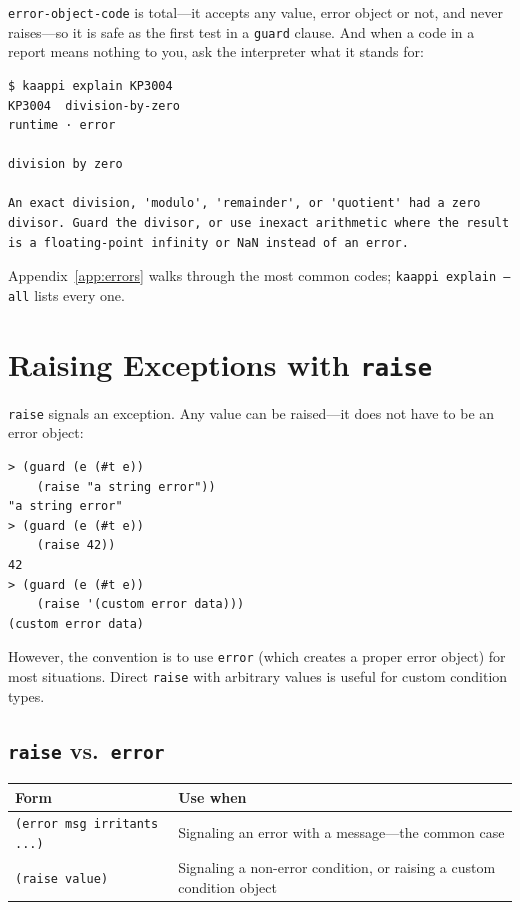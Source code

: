 \texttt{error-object-code} is total---it accepts any value, error object or not, and never raises---so it is safe as the first test in a \texttt{guard} clause. And when a code in a report means nothing to you, ask the interpreter what it stands for:

\begin{Verbatim}[fontsize=\footnotesize]
$ kaappi explain KP3004
KP3004  division-by-zero
runtime · error

division by zero

An exact division, 'modulo', 'remainder', or 'quotient' had a zero
divisor. Guard the divisor, or use inexact arithmetic where the result
is a floating-point infinity or NaN instead of an error.
\end{Verbatim}

Appendix~\ref{app:errors} walks through the most common codes; \texttt{kaappi explain --all} lists every one.

\section{Raising Exceptions with \texttt{raise}}

\texttt{raise} signals an exception. Any value can be raised---it does not have to be an error object:

\begin{lstlisting}[style=repl]
> (guard (e (#t e))
    (raise "a string error"))
"a string error"
> (guard (e (#t e))
    (raise 42))
42
> (guard (e (#t e))
    (raise '(custom error data)))
(custom error data)
\end{lstlisting}

However, the convention is to use \texttt{error} (which creates a proper error object) for most situations. Direct \texttt{raise} with arbitrary values is useful for custom condition types.

\subsection{\texttt{raise} vs.\ \texttt{error}}

\begin{center}
\begin{tabular}{lp{6cm}}
\textbf{Form} & \textbf{Use when} \\
\hline
\texttt{(error msg irritants ...)} & Signaling an error with a message---the common case \\
\texttt{(raise value)} & Signaling a non-error condition, or raising a custom condition object \\
\end{tabular}
\end{center}

